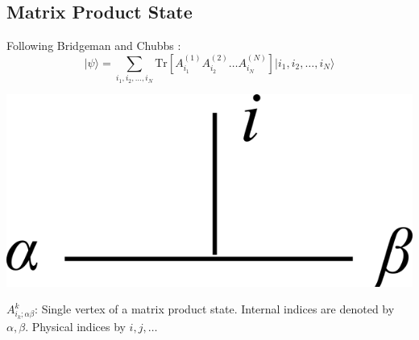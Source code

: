 \documentclass[a0,portrait]{a0poster}
\newcommand{\ket}[1]{\vert #1 \rangle}
\newcommand{\Tr}{\mathrm{Tr}}
\begin{document}
\begin{multicols}{2}


\color{Navy}

\section*{Matrix Product State}

Following Bridgeman and Chubbs \cite{Bridgeman2016Hand-waving}:
\begin{equation}\label{eqn:mps-ansatz}
	\ket{\psi} = \sum_{i_1, i_2, \ldots, i_N} \Tr\left[ A^{(1)}_{i_1} A^{(2)}_{i_2} \ldots A^{(N)}_{i_N} \right] \ket{i_1, i_2, \ldots, i_N}
\end{equation}

\vspace*{2cm}

\begin{minipage}[m]{0.4\columnwidth}
	\centering
	\includegraphics[width=0.5\linewidth]{mps-vertex}
	\label{fig:mps-vertex}
\end{minipage}
\begin{minipage}[m]{0.4\columnwidth}
	$ A^k_{i_k;\alpha\beta} $: Single vertex of a matrix product state. Internal indices are denoted by $ \alpha, \beta $. Physical indices by $ i,j,\ldots $
\end{minipage}

\vspace*{2cm}


\end{multicols}
\end{document}
